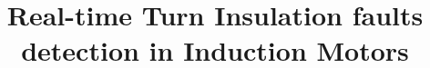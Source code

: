 \documentclass[
  doctype=mscplan,          %
  school=unl/fct,       %
  lang=en,              %
  coverlang=en,         %
  copyrightlang=en,     %
  fontstyle=kpfonts,    %
  chapstyle=elegant,    %
  otherlistsat=front,   %
  aftercover=false,     %
	linkscolor=darkblue,  %
  printcommittee=false,  %
	spine=false,          %
	biblatex={            %
		style=numeric,      %
		sorting=nyt,        %
		firstinits=true,    %
		sortcites=true,     %
    hyperref=true       %
	},
	memoir={	            %
    a4paper,            %
    11pt,               %
    draft,              %
  },
  media=screen,         %
]{unlthesis}
\title{Real-time Turn Insulation faults detection in Induction Motors}
\subtitle{}
\numberwithin{equation}{subsection}
\begin{document}
\thesisfrontmatter	%
\printcoverpage		%
\printaftercover
\printcopyright		%
\printdedicatory	%
\printacknowledgements	%
\printquote		%
\printabstract		%
\tableofcontents* 	%
\printotherlists 	%


\thesismainmatter	%
\printchapthers		%
\printbib		%
\printotherlists 	%
\printappendixes	%
\printbackcoverpage
\end{document}
